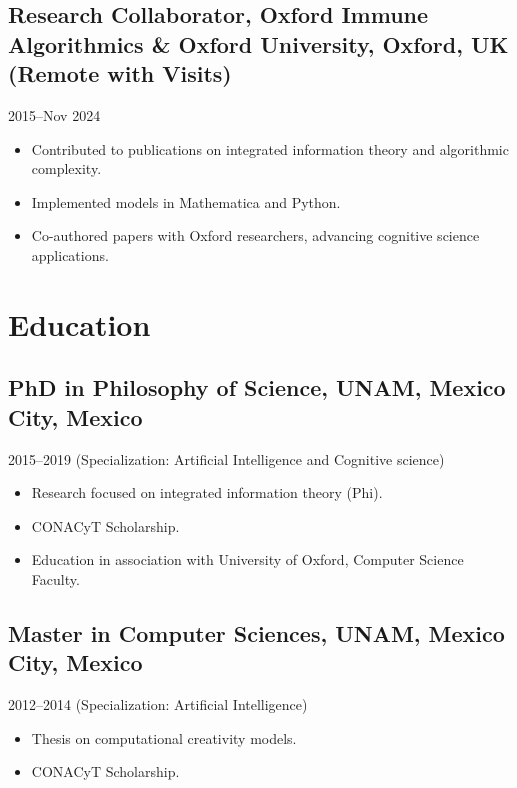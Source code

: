 \documentclass{article}
\begin{document}
\subsection{Research Collaborator, Oxford Immune Algorithmics \& Oxford University, Oxford, UK (Remote with Visits)}
2015--Nov 2024
\begin{itemize}
\item Contributed to publications on integrated information theory and algorithmic complexity.
\item Implemented models in Mathematica and Python.
\item Co-authored papers with Oxford researchers, advancing cognitive science applications.
\end{itemize}

\section{Education}
\subsection{PhD in Philosophy of Science, UNAM, Mexico City, Mexico}
2015--2019 (Specialization: Artificial Intelligence and Cognitive science)
\begin{itemize}
\item Research focused on integrated information theory (Phi).
\item CONACyT Scholarship.
\item Education in association with University of Oxford, Computer Science Faculty.
\end{itemize}

\subsection{Master in Computer Sciences, UNAM, Mexico City, Mexico}
2012--2014 (Specialization: Artificial Intelligence)
\begin{itemize}
\item Thesis on computational creativity models.
\item CONACyT Scholarship.
\end{itemize}
\end{document}
